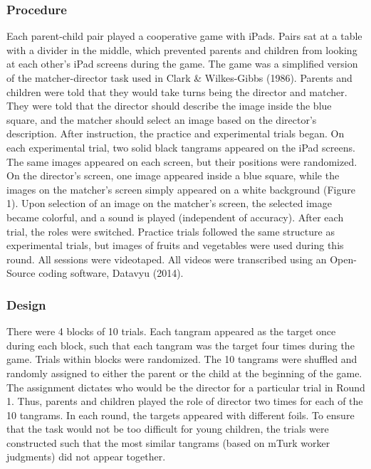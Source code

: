 \documentclass[10pt, letterpaper]{article}
\begin{document}
\hypertarget{procedure}{%
\subsubsection{Procedure}\label{procedure}}

Each parent-child pair played a cooperative game with iPads. Pairs sat
at a table with a divider in the middle, which prevented parents and
children from looking at each other's iPad screens during the game. The
game was a simplified version of the matcher-director task used in Clark
\& Wilkes-Gibbs (1986). Parents and children were told that they would
take turns being the director and matcher. They were told that the
director should describe the image inside the blue square, and the
matcher should select an image based on the director's description.
After instruction, the practice and experimental trials began. On each
experimental trial, two solid black tangrams appeared on the iPad
screens. The same images appeared on each screen, but their positions
were randomized. On the director's screen, one image appeared inside a
blue square, while the images on the matcher's screen simply appeared on
a white background (Figure 1). Upon selection of an image on the
matcher's screen, the selected image became colorful, and a sound is
played (independent of accuracy). After each trial, the roles were
switched. Practice trials followed the same structure as experimental
trials, but images of fruits and vegetables were used during this round.
All sessions were videotaped. All videos were transcribed using an
Open-Source coding software, Datavyu (2014).

\hypertarget{design}{%
\subsubsection{Design}\label{design}}

There were 4 blocks of 10 trials. Each tangram appeared as the target
once during each block, such that each tangram was the target four times
during the game. Trials within blocks were randomized. The 10 tangrams
were shuffled and randomly assigned to either the parent or the child at
the beginning of the game. The assignment dictates who would be the
director for a particular trial in Round 1. Thus, parents and children
played the role of director two times for each of the 10 tangrams. In
each round, the targets appeared with different foils. To ensure that
the task would not be too difficult for young children, the trials were
constructed such that the most similar tangrams (based on mTurk worker
judgments) did not appear together.
\end{document}
